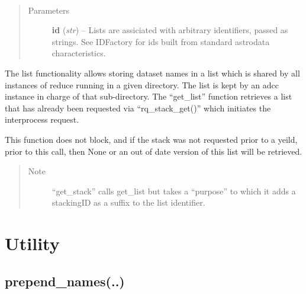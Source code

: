 \documentclass[letterpaper,10pt,english]{sphinxmanual}
\begin{document}
\begin{fulllineitems}
\label{chapter_ReductionContextClass:astrodata.RecipeManager.ReductionContext.get_list}~\begin{quote}\begin{description}
\item[{Parameters}] \leavevmode
\textbf{id} (\emph{str}) -- Lists are assiciated with arbitrary identifiers,
passed as strings.  See IDFactory for ids built from
standard astrodata characteristics.

\end{description}\end{quote}

The list functionality allows storing dataset names in a list
which is shared by all instances of reduce running in a given
directory.  The list is kept by an adcc instance in charge of that
sub-directory.  The ``get\_list'' function retrieves a list that has
already been requested via ``rq\_stack\_get()'' which initiates the
interprocess request.

This function does not block, and if the stack was not requested
prior to a yeild, prior to this call, then None or an out of date
version of this list will be retrieved.
\begin{quote}\begin{description}
\item[{Note }] \leavevmode
``get\_stack'' calls get\_list but takes a ``purpose'' to which it adds
a stackingID as a suffix to the list identifier.

\end{description}\end{quote}

\end{fulllineitems}



\section{Utility}
\label{chapter_ReductionContextClass:utility}

\subsection{prepend\_names(..)}
\label{chapter_ReductionContextClass:prepend-names}
\end{document}
